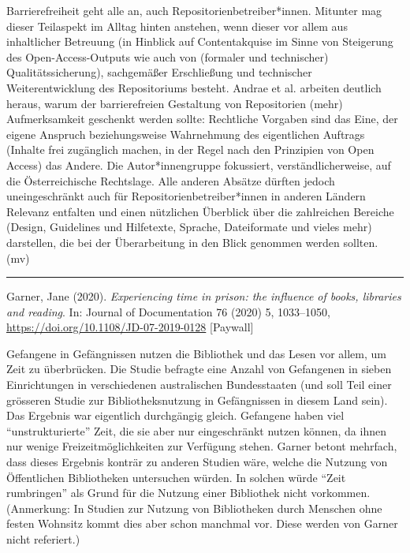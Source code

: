 \documentclass[a4paper,
fontsize=11pt,
oneside,
numbers=noperiodatend,
parskip=half-,
bibliography=totoc,
final
]{scrartcl}
\begin{document}
Barrierefreiheit geht alle an, auch Repositorienbetreiber*innen.
Mitunter mag dieser Teilaspekt im Alltag hinten anstehen, wenn dieser
vor allem aus inhaltlicher Betreuung (in Hinblick auf Contentakquise im
Sinne von Steigerung des Open-Access-Outputs wie auch von (formaler und
technischer) Qualitätssicherung), sachgemäßer Erschließung und
technischer Weiterentwicklung des Repositoriums besteht. Andrae et al.
arbeiten deutlich heraus, warum der barrierefreien Gestaltung von
Repositorien (mehr) Aufmerksamkeit geschenkt werden sollte: Rechtliche
Vorgaben sind das Eine, der eigene Anspruch beziehungsweise Wahrnehmung
des eigentlichen Auftrags (Inhalte frei zugänglich machen, in der Regel
nach den Prinzipien von Open Access) das Andere. Die Autor*innengruppe
fokussiert, verständlicherweise, auf die Österreichische Rechtslage.
Alle anderen Absätze dürften jedoch uneingeschränkt auch für
Repositorienbetreiber*innen in anderen Ländern Relevanz entfalten und
einen nützlichen Überblick über die zahlreichen Bereiche (Design,
Guidelines und Hilfetexte, Sprache, Dateiformate und vieles mehr)
darstellen, die bei der Überarbeitung in den Blick genommen werden
sollten. (mv)

\begin{center}\rule{0.5\linewidth}{0.5pt}\end{center}

Garner, Jane (2020). \emph{Experiencing time in prison: the influence of
books, libraries and reading}. In: Journal of Documentation 76 (2020) 5,
1033--1050, \url{https://doi.org/10.1108/JD-07-2019-0128} {[}Paywall{]}

Gefangene in Gefängnissen nutzen die Bibliothek und das Lesen vor allem,
um Zeit zu überbrücken. Die Studie befragte eine Anzahl von Gefangenen
in sieben Einrichtungen in verschiedenen australischen Bundesstaaten
(und soll Teil einer grösseren Studie zur Bibliotheksnutzung in
Gefängnissen in diesem Land sein). Das Ergebnis war eigentlich
durchgängig gleich. Gefangene haben viel \enquote{unstrukturierte} Zeit,
die sie aber nur eingeschränkt nutzen können, da ihnen nur wenige
Freizeitmöglichkeiten zur Verfügung stehen. Garner betont mehrfach, dass
dieses Ergebnis konträr zu anderen Studien wäre, welche die Nutzung von
Öffentlichen Bibliotheken untersuchen würden. In solchen würde
\enquote{Zeit rumbringen} als Grund für die Nutzung einer Bibliothek
nicht vorkommen. (Anmerkung: In Studien zur Nutzung von Bibliotheken
durch Menschen ohne festen Wohnsitz kommt dies aber schon manchmal vor.
Diese werden von Garner nicht referiert.)
\end{document}
